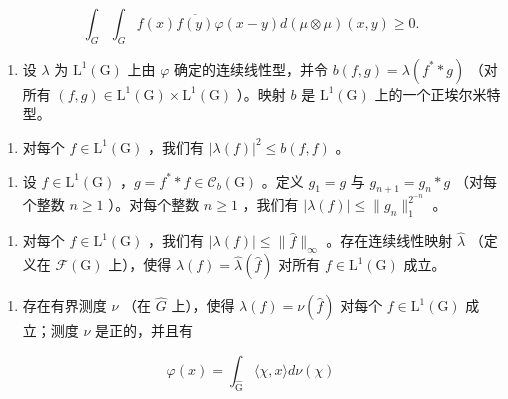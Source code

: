 \[
\int_ {G} \int_ {G} f (x) \overline {{f (y)}} \varphi (x - y) d (\mu \otimes \mu) (x, y) \geqslant 0.
\]

\begin{enumerate}
\def\labelenumi{\alph{enumi})}
\setcounter{enumi}{3}
\tightlist
\item
  设 \(\lambda\) 为 \(\mathrm{L}^{1}(\mathrm{G})\) 上由 \(\varphi\) 确定的连续线性型，并令 \(b(f,g)=\lambda(f^{*}*g)\) （对所有 \((f,g)\in\mathrm{L}^{1}(\mathrm{G})\times\mathrm{L}^{1}(\mathrm{G})\) ）。映射 \(b\) 是 \(\mathrm{L}^{1}(\mathrm{G})\) 上的一个正埃尔米特型。
\end{enumerate}

\begin{enumerate}
\def\labelenumi{\alph{enumi})}
\setcounter{enumi}{4}
\tightlist
\item
  对每个 \(f \in \mathrm{L}^1(\mathrm{G})\) ，我们有 \(|\lambda(f)|^2 \leqslant b(f, f)\) 。
\end{enumerate}

\begin{enumerate}
\def\labelenumi{\alph{enumi})}
\setcounter{enumi}{5}
\tightlist
\item
  设 \(f \in \mathrm{L}^{1}(\mathrm{G})\) ，\(g = f^{*} * f \in \mathcal{C}_{b}(\mathrm{G})\) 。定义 \(g_{1} = g\) 与 \(g_{n+1} = g_{n} * g\) （对每个整数 \(n \geqslant 1\) ）。对每个整数 \(n \geqslant 1\) ，我们有 \(|\lambda(f)| \leqslant \|g_{n}\|_{1}^{2^{-n}}\) 。
\end{enumerate}

\begin{enumerate}
\def\labelenumi{\alph{enumi})}
\setcounter{enumi}{6}
\tightlist
\item
  对每个 \(f \in \mathrm{L}^{1}(\mathrm{G})\) ，我们有 \(|\lambda(f)| \leqslant \| \widehat{f} \|_{\infty}\) 。存在连续线性映射 \(\widehat{\lambda}\) （定义在 \(\mathcal{F}(\mathrm{G})\) 上），使得 \(\lambda(f) = \widehat{\lambda}(\widehat{f})\) 对所有 \(f \in \mathrm{L}^{1}(\mathrm{G})\) 成立。
\end{enumerate}

\begin{enumerate}
\def\labelenumi{\alph{enumi})}
\setcounter{enumi}{7}
\tightlist
\item
  存在有界测度 \(\nu\) （在 \(\widehat{G}\) 上），使得 \(\lambda(f) = \nu(\widehat{f})\) 对每个 \(f \in \mathrm{L}^{1}(\mathrm{G})\) 成立；测度 \(\nu\) 是正的，并且有
\end{enumerate}

\[
\varphi (x) = \int_ {\widehat {\mathrm{G}}} \langle \chi , x \rangle d \nu (\chi)
\]

